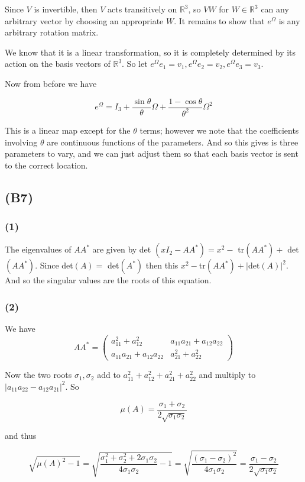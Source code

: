 \documentclass{article}
\begin{document}
Since $V$ is invertible, then $V$ acts transitively on $\mathbb{R}^3$, so $VW$ for $W \in \mathbb{R}^3$ can any arbitrary vector by choosing an appropriate $W$. It remains to show that $e^{\Omega}$ is any arbitrary rotation matrix. 

We know that it is a linear transformation, so it is completely determined by its action on the basis vectors of $\mathbb{R}^3$. So let $e^{\Omega} e_1 = v_1, e^{\Omega} e_2 = v_2, e^{\Omega} e_3 = v_3$. 

Now from before we have 

\[ e^{\Omega} = I_3+ \dfrac{\sin \theta}{\theta} \Omega + \dfrac{1 - \cos \theta}{\theta^2} \Omega^2 \]

This is a linear map except for the $\theta$ terms; however we note that the coefficients involving $\theta$ are continuous functions of the parameters. And so this gives is three parameters to vary, and we can just adjust them so that each basis vector is sent to the correct location. 

\subsection{(B7)}

\subsubsection{(1)}
The eigenvalues of $AA^*$ are given by det $(xI_2 - AA^*) = x^2 - $ tr$(AA^*) + $ det$(AA^*)$. Since det$(A) = $ det$(A^*)$ then this $x^2 - $tr$(AA^*) + |$det$(A)|^2$. And so the singular values are the roots of this equation. 

\subsubsection{(2)}
We have 
\[AA^* = \left(\begin{array}{cc} a_{11}^2 + a_{12}^2 & a_{11} a_{21} + a_{12} a_{22} \\ a_{11} a_{21} + a_{12} a_{22} & a_{21}^2 + a_{22}^2 \end{array}\right) \]

Now the two roots $\sigma_1, \sigma_2$ add to $a_{11}^2 + a_{12}^2 + a_{21}^2 + a_{22}^2$ and multiply to $|a_{11} a_{22} - a_{12} a_{21}|^2$.  So 

\[ \mu(A) = \dfrac{\sigma_1 + \sigma_2}{2\sqrt{\sigma_1 \sigma_2}} \]

and thus

\[ \sqrt{\mu(A)^2 - 1} = \sqrt{\dfrac{\sigma_1^2 + \sigma_2^2 + 2\sigma_1 \sigma_2}{4 \sigma_1 \sigma_2} - 1} = \sqrt{\dfrac{(\sigma_1 - \sigma_2)^2}{4 \sigma_1 \sigma_2}} = \dfrac{\sigma_1 - \sigma_2}{2\sqrt{\sigma_1 \sigma_2}}\]
\end{document}
